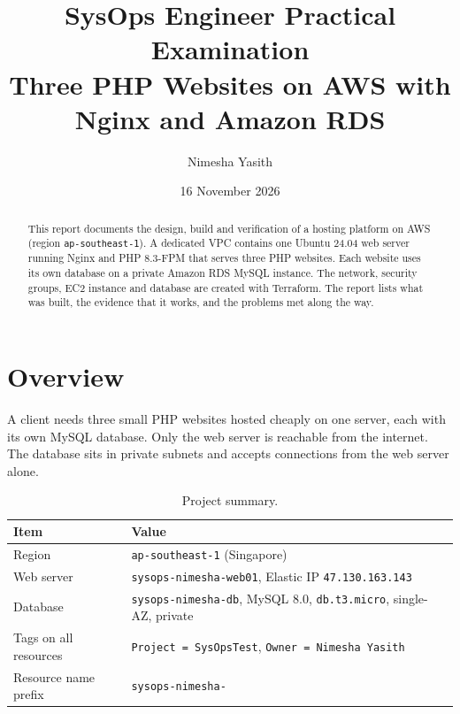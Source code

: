 \documentclass[11pt,a4paper]{article}
\title{\textbf{SysOps Engineer Practical Examination}\\[4pt]
\large Three PHP Websites on AWS with Nginx and Amazon RDS}
\author{Nimesha Yasith}
\date{16 November 2026}
\newcommand{\code}[1]{\texttt{#1}}
\begin{document}
\maketitle

\begin{abstract}
This report documents the design, build and verification of a hosting platform on AWS
(region \code{ap-southeast-1}). A dedicated VPC contains one Ubuntu 24.04 web server
running Nginx and PHP 8.3-FPM that serves three PHP websites. Each website uses its own
database on a private Amazon RDS MySQL instance. The network, security groups, EC2 instance
and database are created with Terraform. The report lists what was built, the evidence that
it works, and the problems met along the way.
\end{abstract}

\tableofcontents
\newpage

\section{Overview}
A client needs three small PHP websites hosted cheaply on one server, each with its own
MySQL database. Only the web server is reachable from the internet. The database sits in
private subnets and accepts connections from the web server alone.

\begin{table}[H]
\centering
\begin{tabular}{@{}ll@{}}
\toprule
\textbf{Item} & \textbf{Value}\\
\midrule
Region & \code{ap-southeast-1} (Singapore)\\
Web server & \code{sysops-nimesha-web01}, Elastic IP \code{47.130.163.143}\\
Database & \code{sysops-nimesha-db}, MySQL 8.0, \code{db.t3.micro}, single-AZ, private\\
Tags on all resources & \code{Project = SysOpsTest}, \code{Owner = Nimesha Yasith}\\
Resource name prefix & \code{sysops-nimesha-}\\
\bottomrule
\end{tabular}
\caption{Project summary.}
\end{table}

\end{document}
